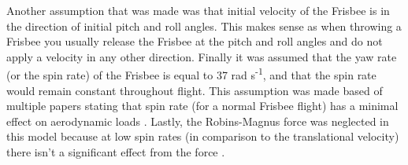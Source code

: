 \documentclass[12pt,twoside,letterpaper]{article}
\begin{document}
\begin{multicols}{2}
Another assumption that was made was that initial velocity of the Frisbee is in the direction of initial pitch and roll angles. This makes sense as when throwing a Frisbee you usually release the Frisbee at the pitch and roll angles and do not apply a velocity in any other direction. Finally it was assumed that the yaw rate (or the spin rate) of the Frisbee is equal to 37 rad s\textsuperscript{-1}\cite{Lorenz2005}, and that the spin rate would remain constant throughout flight. This assumption was made based of multiple papers stating that spin rate (for a normal Frisbee flight) has a minimal effect on aerodynamic loads \cite{Pozderac2016}. Lastly, the Robins-Magnus force was neglected in this model because at low spin rates (in comparison to the translational velocity) there isn't a significant effect from the force \cite{Pozderac2016}.

\vfill
\newpage

\end{multicols}
\end{document}
